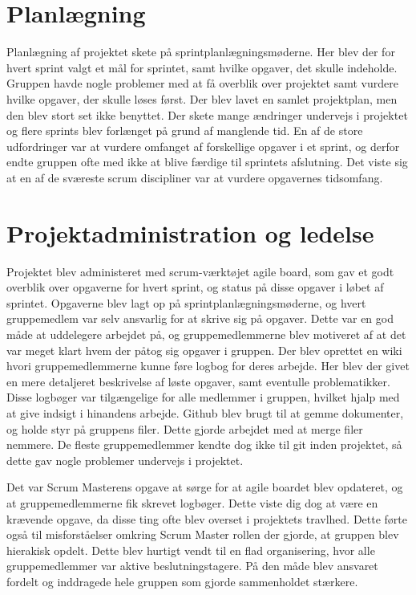 \section{Planlægning}
Planlægning af projektet skete på sprintplanlægningsmøderne. Her blev der for hvert sprint valgt et mål for sprintet, samt hvilke opgaver, det skulle indeholde.
Gruppen havde nogle problemer med at få overblik over projektet samt vurdere hvilke opgaver, der skulle løses først. Der blev lavet en samlet projektplan,
men den blev stort set ikke benyttet.
Der skete mange ændringer undervejs i projektet og flere sprints blev forlænget på grund af manglende tid. En af de store udfordringer var at vurdere omfanget
af forskellige opgaver i et sprint, og derfor endte gruppen ofte med ikke at blive færdige til sprintets afslutning. Det viste sig at en af de sværeste
scrum discipliner var at vurdere opgavernes tidsomfang.

\section{Projektadministration og ledelse}
Projektet blev administeret med scrum-værktøjet agile board, som gav et godt overblik over opgaverne for hvert sprint, og status på disse opgaver
i løbet af sprintet. Opgaverne blev lagt op på sprintplanlægningsmøderne, og hvert gruppemedlem var selv ansvarlig for at skrive sig på opgaver.
Dette var en god måde at uddelegere arbejdet på, og gruppemedlemmerne blev motiveret af at det var meget klart hvem der påtog sig opgaver i gruppen. 
Der blev oprettet en wiki hvori gruppemedlemmerne kunne føre logbog for deres arbejde. Her blev der givet en mere detaljeret beskrivelse af løste opgaver,
samt eventulle problematikker. Disse logbøger var tilgængelige for alle medlemmer i gruppen, hvilket hjalp med at give indsigt i hinandens arbejde.
Github blev brugt til at gemme dokumenter, og holde styr på gruppens filer. Dette gjorde arbejdet med at merge filer nemmere. De fleste gruppemedlemmer
kendte dog ikke til git inden projektet, så dette gav nogle problemer undervejs i projektet.

Det var Scrum Masterens opgave at sørge for at agile boardet blev opdateret, og at gruppemedlemmerne fik skrevet logbøger. Dette viste dig dog at være en krævende
opgave, da disse ting ofte blev overset i projektets travlhed. 
Dette førte også til misforståelser omkring Scrum Master rollen der gjorde, at gruppen blev hierakisk opdelt. Dette blev hurtigt vendt til en flad organisering,
hvor alle gruppemedlemmer var aktive beslutningstagere. På den måde blev ansvaret fordelt og inddragede hele gruppen som gjorde sammenholdet stærkere.

